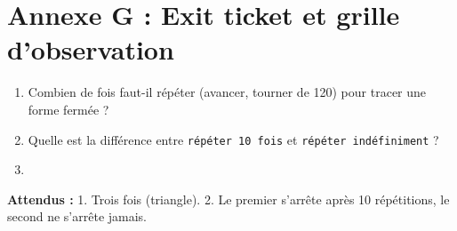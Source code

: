 \documentclass[11pt,a4paper]{article}
\begin{document}
\section*{Annexe G : Exit ticket et grille d'observation}

\begin{enumerate}
 \item Combien de fois faut-il répéter (avancer, tourner de 120) pour tracer une forme fermée ?\\ \lig
 \item Quelle est la différence entre \texttt{répéter 10 fois} et \texttt{répéter indéfiniment} ?\\ \lig
 \item \autoeval
\end{enumerate}
\textbf{Attendus :} 1. Trois fois (triangle). 2. Le premier s'arrête après 10 répétitions, le second ne s'arrête jamais.

\bigskip
{}
\end{document}
